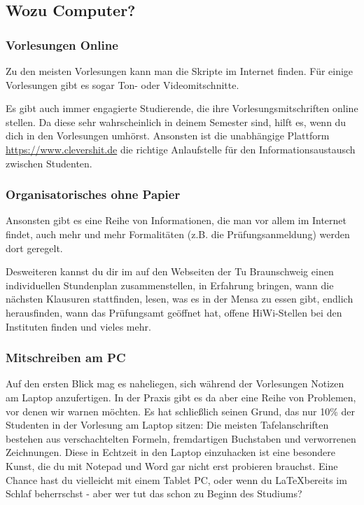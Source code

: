 	\subsection{Wozu Computer?}
		\subsubsection{Vorlesungen Online}
			Zu den meisten Vorlesungen kann man die Skripte im Internet finden. Für einige Vorlesungen gibt es sogar Ton- oder Videomitschnitte.

			Es gibt auch immer engagierte Studierende, die ihre Vorlesungsmitschriften online stellen. Da diese sehr wahrscheinlich in deinem Semester sind, hilft es, wenn du dich in den Vorlesungen umhörst. Ansonsten ist die unabhängige Plattform \url{https://www.clevershit.de} die richtige Anlaufstelle für den Informationsaustausch zwischen Studenten.

		\subsubsection{Organisatorisches ohne Papier}
			Ansonsten gibt es eine Reihe von Informationen, die man vor allem im Internet findet, auch mehr und mehr Formalitäten (z.B. die Prüfungsanmeldung) werden dort geregelt.

			Desweiteren kannst du dir im auf den Webseiten der Tu Braunschweig einen individuellen Stundenplan zusammenstellen, in Erfahrung bringen, wann die nächsten Klausuren stattfinden, lesen, was es in der Mensa zu essen gibt, endlich herausfinden, wann das Prüfungsamt geöffnet hat,  offene HiWi-Stellen bei den Instituten finden und vieles mehr.

		\subsubsection{Mitschreiben am PC}
			Auf den ersten Blick mag es naheliegen, sich während der Vorlesungen Notizen am Laptop anzufertigen. In der Praxis gibt es da aber eine Reihe von Problemen, vor denen wir  warnen möchten. Es hat schließlich seinen Grund, das nur 10\% der Studenten in der Vorlesung am Laptop sitzen: Die meisten Tafelanschriften bestehen  aus verschachtelten Formeln, fremdartigen Buchstaben und verworrenen Zeichnungen. Diese in Echtzeit in den Laptop einzuhacken ist eine besondere Kunst, die du mit Notepad und Word gar nicht erst probieren brauchst. Eine Chance hast du vielleicht mit einem Tablet PC, oder wenn du \LaTeX bereits im Schlaf beherrschst - aber wer tut das schon zu Beginn des Studiums?

